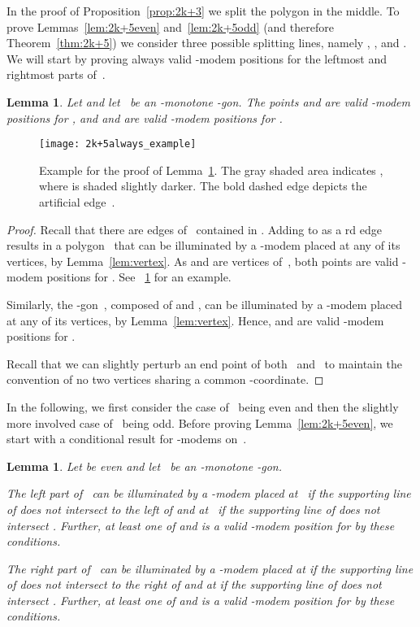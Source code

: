 \documentclass[A4]{article}
\newtheorem{lemma}[theorem]{Lemma}
\begin{document}
In the proof of Proposition~\ref{prop:2k+3} we split the polygon in the middle.
To prove Lemmas~\ref{lem:2k+5even} and~\ref{lem:2k+5odd} (and therefore Theorem~\ref{thm:2k+5}) we consider three possible splitting lines, namely , , and .
We will start by proving always valid \mbox{-modem} positions for the leftmost and rightmost parts of~.

\begin{lemma}\label{lem:2k+5always}
Let  and let~ be an -monotone -gon.
The points  and  are valid \mbox{-modem} positions for , and  and  are valid \mbox{-modem} positions for .
\end{lemma}

\begin{figure}[htb]
  \centering
  \texttt{[image: 2k+5always\_example]}
  \caption{Example for the proof of Lemma~\ref{lem:2k+5always}. 
    The gray shaded area indicates , where  is shaded slightly darker.
    The bold dashed edge depicts the artificial edge~.}
  \label{fig:2k+5always}
\end{figure}


\begin{proof}
Recall that there are  edges of~ contained in .
Adding  to  as a rd edge results in a polygon~ that can be illuminated by a \mbox{-modem} placed at any of its vertices, by Lemma~\ref{lem:vertex}.
As  and  are vertices of~, both points are valid \mbox{-modem} positions for .
See \figurename~\ref{fig:2k+5always} for an example.

Similarly, the -gon~, composed of  and , can be illuminated by a \mbox{-modem} placed at any of its vertices, by Lemma~\ref{lem:vertex}.
Hence,  and  are valid \mbox{-modem} positions for .

Recall that we can slightly perturb an end point of both~ and~ to maintain the convention of no two vertices sharing a common -coordinate.
\end{proof}


In the following, we first consider the case of~ being even and then the slightly more involved case of~ being odd.
Before proving Lemma~\ref{lem:2k+5even}, we start with a conditional result for \mbox{-modems} on~.


\begin{lemma}\label{lem:2k+5subeven}
Let  be even and let~ be an -monotone -gon.

The left part  of~ can be illuminated by a \mbox{-modem} placed
at~ if the supporting line of  does not intersect  to the left of  and
at~ if the supporting line of  does not intersect .
Further, at least one of  and  is a valid \mbox{-modem} position for  by these conditions.

The right part  of~ can be illuminated by a \mbox{-modem} placed
at  if the supporting line of  does not intersect  to the right of  and
at  if the supporting line of  does not intersect .
Further, at least one of  and  is a valid \mbox{-modem} position for  by these conditions.
\end{lemma}
\end{document}
